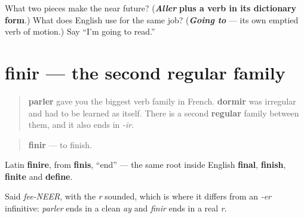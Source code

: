 \begin{tcolorbox}[breakable,colback=teal!4,colframe=teal!35!black,title={Before you move on}]
What two pieces make the near future? (\emph{\textbf{Aller}} \textbf{plus a verb in its dictionary form}.) What does English use for the same job? (\emph{\textbf{Going to}} — its own emptied verb of motion.) Say \textquotedblleft{}I'm going to read.\textquotedblright{}
\end{tcolorbox}
\section[finir]{finir — the second regular family}

\label{lesson:FR-C37-finir}



\begin{quote}
\textbf{parler} gave you the biggest verb family in French. \textbf{dormir} was irregular and had to be learned as itself. There is a second \textbf{regular} family between them, and it also ends in \emph{-ir}.
\end{quote}

\begin{cousinweb}
\begin{quote}
\textbf{finir} — to finish.
\end{quote}

Latin \textbf{finire}, from \textbf{finis}, \textquotedblleft{}end\textquotedblright{} — the same root inside English \textbf{final}, \textbf{finish}, \textbf{finite} and \textbf{define}.

Said \emph{fee-NEER}, with the \emph{r} sounded, which is where it differs from an \emph{-er} infinitive: \emph{parler} ends in a clean \emph{ay} and \emph{finir} ends in a real \emph{r}.
\end{cousinweb}

